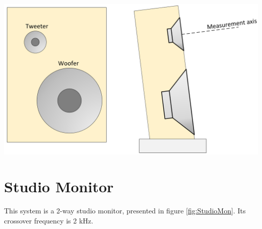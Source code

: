 \documentclass{report}
\begin{document}
\begin{appendices}
\begin{minipage}{0.6\textwidth}
\end{minipage}
\begin{minipage}{0.4\textwidth}
\begin{center}
	\includegraphics[scale=0.2]{Sym/Spkr_BmO}
    \captionsetup{hypcap=false}
    \label{fig:2wayDiagSpkr}
\end{center}
\end{minipage}

\section{Studio Monitor}
\label{sprklib:Studio}

\begin{minipage}{0.6\textwidth}
This system is a 2-way studio monitor, presented in figure \ref{fig:StudioMon}. Its crossover frequency is 2 kHz.


\end{minipage}
\end{appendices}
\end{document}
